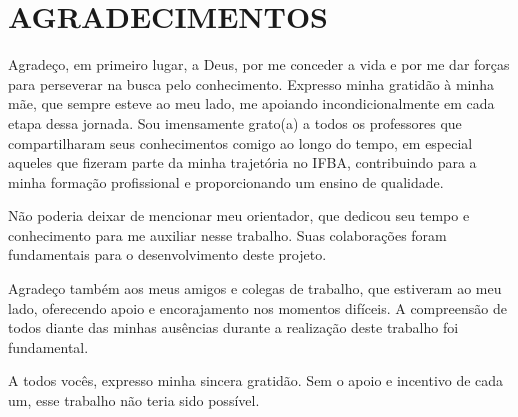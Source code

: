 \pagebreak\newpage\clearpage
\pagestyle{plain}

\chapter*{AGRADECIMENTOS}
    
Agradeço, em primeiro lugar, a Deus, por me conceder a vida e por me dar forças para perseverar na busca pelo conhecimento. Expresso minha gratidão à minha mãe, que sempre esteve ao meu lado, me apoiando incondicionalmente em cada etapa dessa jornada. Sou imensamente grato(a) a todos os professores que compartilharam seus conhecimentos comigo ao longo do tempo, em especial aqueles que fizeram parte da minha trajetória no IFBA, contribuindo para a minha formação profissional e proporcionando um ensino de qualidade.

Não poderia deixar de mencionar meu orientador, que dedicou seu tempo e conhecimento para me auxiliar nesse trabalho. Suas colaborações foram fundamentais para o desenvolvimento deste projeto.

Agradeço também aos meus amigos e colegas de trabalho, que estiveram ao meu lado, oferecendo apoio e encorajamento nos momentos difíceis. A compreensão de todos diante das minhas ausências durante a realização deste trabalho foi fundamental.

A todos vocês, expresso minha sincera gratidão. Sem o apoio e incentivo de cada um, esse trabalho não teria sido possível.
